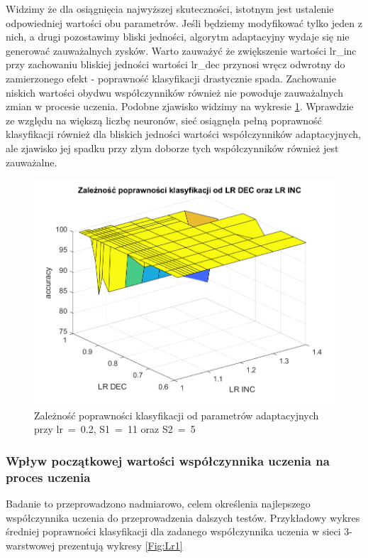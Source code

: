 \documentclass[12pt,twoside]{article}
\begin{document}
Widzimy że dla osiągnięcia najwyższej skuteczności, istotnym jest ustalenie odpowiedniej wartości obu parametrów.
Jeśli będziemy modyfikować tylko jeden z nich, a drugi pozostawimy bliski jedności, algorytm adaptacyjny wydaje się nie generować zauważalnych zysków.
Warto zauważyć że zwiększenie wartości lr\_inc przy zachowaniu bliskiej jedności wartości lr\_dec przynosi wręcz odwrotny do zamierzonego efekt - poprawność klasyfikacji drastycznie spada.
Zachowanie niskich wartości obydwu współczynników również nie powoduje zauważalnych zmian w procesie uczenia.
Podobne zjawisko widzimy na wykresie \ref{Fig:IncDec6}.
Wprawdzie ze względu na większą liczbę neuronów, sieć osiągnęła pełną poprawność klasyfikacji również dla bliskich jedności wartości współczynników adaptacyjnych, ale zjawisko jej spadku przy złym doborze tych współczynników również jest zauważalne.

\begin{figure}[ht]
	\centering
	\includegraphics[width=16cm]{figures/IncDec_6.png}
	\caption{Zależność poprawności klasyfikacji od parametrów adaptacyjnych przy lr~=~0.2, S1~=~11 oraz S2~=~5}
	\label{Fig:IncDec6}
\end{figure}

\clearpage
\subsubsection{Wpływ początkowej wartości współczynnika uczenia na proces uczenia}
Badanie to przeprowadzono nadmiarowo, celem określenia najlepszego współczynnika uczenia do przeprowadzenia dalszych testów.
Przykładowy wykres średniej poprawności klasyfikacji dla zadanego współczynnika uczenia w sieci 3-warstwowej prezentują wykresy \ref{Fig:Lr1}
\end{document}

